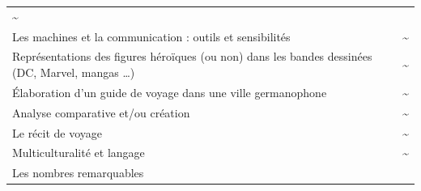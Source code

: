 \documentclass[
  10pt,
  french,
  a5paper,
  openany]{book}
\begin{document}
\begin{longtable}[]{@{}lc@{}}
\begin{minipage}[t]{0.06\columnwidth}
\textasciitilde{}\strut
\end{minipage}\tabularnewline
\begin{minipage}[t]{0.88\columnwidth}\raggedright
Les machines et la communication : outils et sensibilités\strut
\end{minipage} & \begin{minipage}[t]{0.06\columnwidth}\centering
\textasciitilde{}\strut
\end{minipage}\tabularnewline
\begin{minipage}[t]{0.88\columnwidth}\raggedright
Représentations des figures héroïques (ou non) dans les bandes dessinées (DC, Marvel, mangas \ldots)\strut
\end{minipage} & \begin{minipage}[t]{0.06\columnwidth}\centering
\textasciitilde{}\strut
\end{minipage}\tabularnewline
\begin{minipage}[t]{0.88\columnwidth}\raggedright
Élaboration d'un guide de voyage dans une ville germanophone\strut
\end{minipage} & \begin{minipage}[t]{0.06\columnwidth}\centering
\textasciitilde{}\strut
\end{minipage}\tabularnewline
\begin{minipage}[t]{0.88\columnwidth}\raggedright
Analyse comparative et/ou création\strut
\end{minipage} & \begin{minipage}[t]{0.06\columnwidth}\centering
\textasciitilde{}\strut
\end{minipage}\tabularnewline
\begin{minipage}[t]{0.88\columnwidth}\raggedright
Le récit de voyage\strut
\end{minipage} & \begin{minipage}[t]{0.06\columnwidth}\centering
\textasciitilde{}\strut
\end{minipage}\tabularnewline
\begin{minipage}[t]{0.88\columnwidth}\raggedright
Multiculturalité et langage\strut
\end{minipage} & \begin{minipage}[t]{0.06\columnwidth}\centering
\textasciitilde{}\strut
\end{minipage}\tabularnewline
\begin{minipage}[t]{0.88\columnwidth}\raggedright
Les nombres remarquables\strut
\end{minipage} & \begin{minipage}[t]{0.06\columnwidth}\centering

\end{minipage}
\end{longtable}
\end{document}
